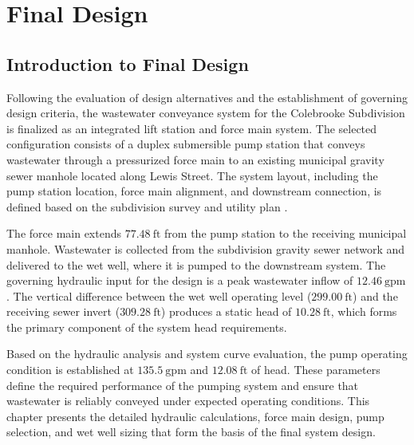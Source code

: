 \chapter{Final Design}

\section{Introduction to Final Design}

Following the evaluation of design alternatives and the establishment of governing design criteria, the wastewater conveyance system for the Colebrooke Subdivision is finalized as an integrated lift station and force main system. The selected configuration consists of a duplex submersible pump station that conveys wastewater through a pressurized force main to an existing municipal gravity sewer manhole located along Lewis Street. The system layout, including the pump station location, force main alignment, and downstream connection, is defined based on the subdivision survey and utility plan \cite{ProjectD_Colebrooke_2020}.

The force main extends $77.48~\text{ft}$ from the pump station to the receiving municipal manhole. Wastewater is collected from the subdivision gravity sewer network and delivered to the wet well, where it is pumped to the downstream system. The governing hydraulic input for the design is a peak wastewater inflow of $12.46~\text{gpm}$. The vertical difference between the wet well operating level ($299.00~\text{ft}$) and the receiving sewer invert ($309.28~\text{ft}$) produces a static head of $10.28~\text{ft}$, which forms the primary component of the system head requirements.

Based on the hydraulic analysis and system curve evaluation, the pump operating condition is established at $135.5~\text{gpm}$ and $12.08~\text{ft}$ of head. These parameters define the required performance of the pumping system and ensure that wastewater is reliably conveyed under expected operating conditions. This chapter presents the detailed hydraulic calculations, force main design, pump selection, and wet well sizing that form the basis of the final system design.


